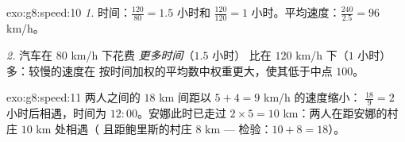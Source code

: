 \begin{solution}{exo:g8:speed:10}
\emph{1.} 时间：$\frac{120}{80} = 1.5$ 小时和 $\frac{120}{120} = 1$
小时。平均速度：$\frac{240}{2.5} = 96$ km/h。

\emph{2.} 汽车在 $80$ km/h 下花费 \emph{更多时间}（$1.5$ 小时）
比在 $120$ km/h 下（$1$ 小时）多：较慢的速度在
按时间加权的平均数中权重更大，使其低于中点 $100$。
\end{solution}

\begin{solution}{exo:g8:speed:11}
两人之间的 $18$ km 间距以 $5 + 4 = 9$ km/h 的速度缩小：
$\frac{18}{9} = 2$ 小时后相遇，时间为 $12{:}00$。安娜此时已走过
$2 \times 5 = 10$ km：两人在距安娜的村庄 $10$ km 处相遇（
且距鲍里斯的村庄 $8$ km --- 检验：$10 + 8 = 18$）。
\end{solution}

